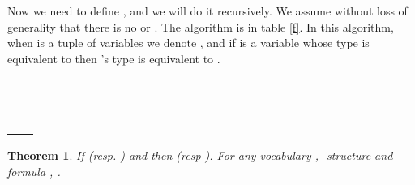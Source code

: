 \documentclass[a4paper,12pt]{article}
\newtheorem{theorem}{Theorem}[section]
\theoremstyle{definition}
\begin{document}
Now we need to define , and we will do it recursively. We assume
without loss of generality that there is no  or . The algorithm is in
table \ref{f}. In this algorithm, when  is a tuple of
variables we denote , 
and if  is a variable whose type is equivalent to  then
's type is equivalent to .
\begin{table*}\label{f}
\begin{tabular}{|l|l|}
  \hline
  &\\
  \hline
  &\\
  &\\
  &\\
  & \\
  &\\
  &\\
  &\\
  &\\
  &\\
  &\\
  &\\
  \hline
\end{tabular}
\caption{F}
\end{table*}
\begin{theorem}
  If  (resp. ) and  then
   (resp ).  For any
  vocabulary , -structure  and -formula
  , .
\end{theorem}
\end{document}
